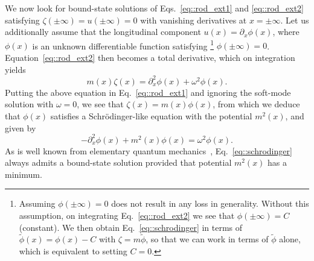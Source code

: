 We now look for bound-state solutions of Eqs.~\eqref{eq::rod_ext1} and \eqref{eq::rod_ext2} satisfying $\zeta(\pm\infty) = u(\pm\infty) = 0$ with vanishing derivatives at $x = \pm\infty$.
Let us additionally assume that the longitudinal component $u(x) = \partial_{x}\phi(x)$, where $\phi(x)$ is an unknown differentiable function satisfying%
\footnote{Assuming $\phi(\pm\infty) = 0$ does not result in any loss in generality.
Without this assumption, on integrating Eq.~\eqref{eq::rod_ext2} we see that $\phi(\pm\infty) = C$ (constant).
We then obtain Eq.~\eqref{eq::schrodinger} in terms of $\widetilde{\phi}(x) = \phi(x) - C$ with $\zeta = m\widetilde{\phi}$, so that we can work in terms of $\widetilde{\phi}$ alone, which is equivalent to setting $C = 0$.}
$\phi(\pm\infty) = 0$.
Equation~\eqref{eq::rod_ext2} then becomes a total derivative, which on integration yields
%
\begin{equation}
  m(x)\zeta(x) = \partial_{x}^{2}\phi(x) + \omega^{2}\phi(x).
\end{equation}
%
Putting the above equation in Eq.~\eqref{eq::rod_ext1} and ignoring the soft-mode solution with $\omega = 0$, we see that $\zeta(x) = m(x)\phi(x)$, from which we deduce that $\phi(x)$ satisfies a Schr\"{o}dinger-like equation with the potential $m^{2}(x)$, and given by
%
\begin{equation}
  -\partial_{x}^{2}\phi(x) + m^{2}(x)\phi(x) = \omega^{2}\phi(x).
  \label{eq::schrodinger}
\end{equation}
%
As is well known from elementary quantum mechanics~\cite{buell1995}, Eq.~\eqref{eq::schrodinger} always admits a bound-state solution provided that potential $m^{2}(x)$ has a minimum.

